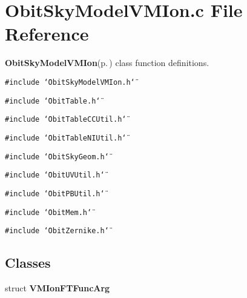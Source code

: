 \section{Obit\-Sky\-Model\-VMIon.c File Reference}
\label{ObitSkyModelVMIon_8c}
{\bf Obit\-Sky\-Model\-VMIon}{\rm (p.\,\pageref{structObitSkyModelVMIon})} class function definitions. 

{\tt \#include \char`\"{}Obit\-Sky\-Model\-VMIon.h\char`\"{}}\par
{\tt \#include \char`\"{}Obit\-Table.h\char`\"{}}\par
{\tt \#include \char`\"{}Obit\-Table\-CCUtil.h\char`\"{}}\par
{\tt \#include \char`\"{}Obit\-Table\-NIUtil.h\char`\"{}}\par
{\tt \#include \char`\"{}Obit\-Sky\-Geom.h\char`\"{}}\par
{\tt \#include \char`\"{}Obit\-UVUtil.h\char`\"{}}\par
{\tt \#include \char`\"{}Obit\-PBUtil.h\char`\"{}}\par
{\tt \#include \char`\"{}Obit\-Mem.h\char`\"{}}\par
{\tt \#include \char`\"{}Obit\-Zernike.h\char`\"{}}\par
\subsection*{Classes}
\begin{CompactItemize}
\item 
struct {\bf VMIon\-FTFunc\-Arg}
\end{CompactItemize}

